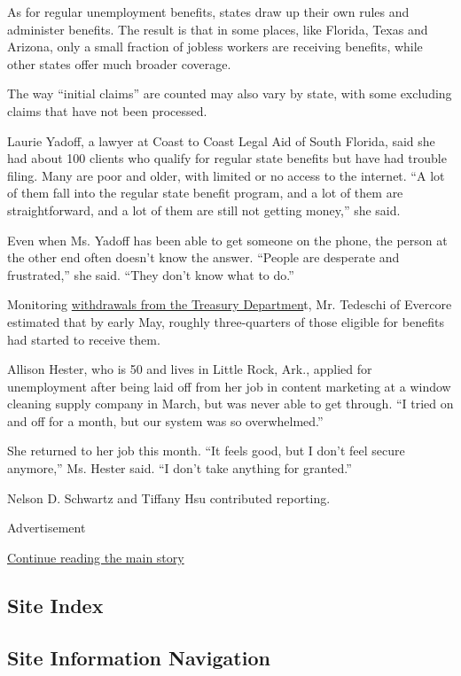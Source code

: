 As for regular unemployment benefits, states draw up their own rules and
administer benefits. The result is that in some places, like Florida,
Texas and Arizona, only a small fraction of jobless workers are
receiving benefits, while other states offer much broader coverage.

The way ``initial claims'' are counted may also vary by state, with some
excluding claims that have not been processed.

Laurie Yadoff, a lawyer at Coast to Coast Legal Aid of South Florida,
said she had about 100 clients who qualify for regular state benefits
but have had trouble filing. Many are poor and older, with limited or no
access to the internet. ``A lot of them fall into the regular state
benefit program, and a lot of them are straightforward, and a lot of
them are still not getting money,'' she said.

Even when Ms. Yadoff has been able to get someone on the phone, the
person at the other end often doesn't know the answer. ``People are
desperate and frustrated,'' she said. ``They don't know what to do.''

Monitoring
\href{https://www.fiscal.treasury.gov/reports-statements/dts/index.html}{withdrawals
from the Treasury Departmen}t, Mr. Tedeschi of Evercore estimated that
by early May, roughly three-quarters of those eligible for benefits had
started to receive them.

Allison Hester, who is 50 and lives in Little Rock, Ark., applied for
unemployment after being laid off from her job in content marketing at a
window cleaning supply company in March, but was never able to get
through. ``I tried on and off for a month, but our system was so
overwhelmed.''

She returned to her job this month. ``It feels good, but I don't feel
secure anymore,'' Ms. Hester said. ``I don't take anything for
granted.''

Nelson D. Schwartz and Tiffany Hsu contributed reporting.

Advertisement

\protect\hyperlink{after-bottom}{Continue reading the main story}

\hypertarget{site-index}{%
\subsection{Site Index}\label{site-index}}

\hypertarget{site-information-navigation}{%
\subsection{Site Information
Navigation}\label{site-information-navigation}}

